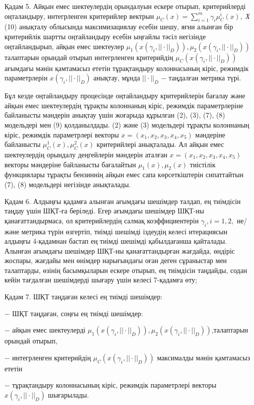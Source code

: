 \begin{multicols}{2}
Қадам 5. Айқын емес шектеулердің орындалуын ескере отырып, критерийлерді
оңталандыру, интегрленген критерийлер вектрын
$\mu_C(x)=\sum_{i=1}^m\gamma_i\mu_C^i(x),$ \emph{Х} (10) анықталу облысында
максимизациялау есебін шешу, яғни алынған бір критерийлік шартты
оңтайландыру есебін ыңғайлы тәсіл негізінде оңтайландырып, айқын емес
шектеулер $\mu_1(x(\gamma_i,||\cdot||_D)),\mu_2(x(\gamma_i,||\cdot||_D))$ талаптарын орындай отырып
интегрленген критерийдің $\mu_C(x(\gamma_i,||\cdot||_D))$ ағымдағы
мәнін қамтамасыз ететін тұрақтандыру колоннасының кіріс, режимдік
параметрлерін $x(\gamma_i,||\cdot||_D)$ анықтау, мұнда
$||\cdot||_D$ − таңдалған метрика түрі.

Бұл кезде оңтайландыру процесінде оңтайландыру критерийлерін бағалау
және айқын емес шектеулердің тұрақты колоннаның кіріс, режимдік
параметрлеріне байланысты мәндерін анықтау үшін жоғарыда құрылған (2),
(3), (7), (8) модельдері мен (9) қолданылдады. (2) және (3) модельдері
тұрақты колоннаның кіріс, режимдік параметрлері векторы
$x=(x_1,x_2,x_3,x_4,x_5)$ мәндеріне байланысты
$\mu_C^1(x),\mu_C^2(x)$ критерийлері анықталады. Ал айқын
емес шектеулердің орындалу деңгейлерін мәндерін аталған
$x=(x_1,x_2,x_3,x_4,x_5)$ векторы мәндеріне байланысты
бағалайтын $\mu_1(x),\mu_2(x)$ тиістілік функциялары
тұрақты бензиннің айқын емес сапа көрсеткіштерін сипаттайтын (7), (8)
модельдері негізінде анықталады.

Қадам 6. Алдыңғы қадамға алынған ағымдағы шешімдер талдап, ең тиімдісін
таңдау үшін ШҚТ-ға беріледі. Егер ағымдағы шешімдер ШҚТ-ны
қанағаттандырмаса, ол критерийлердің салмақ
коэффициентерін $\gamma_i,i=1,2,$ не/және метрика түрін
өзгертіп, тиімді шешімді іздеудің келесі итерациясын алдыңғы 4-қадамнан
бастап ең тиімді шешімді қабылдағанша қайталады. Алынған ағымдағы
шешімдер ШҚТ-ны қанағаттандырған жағдайда, өндіріс жоспары, жағдайы мен
өнімдер нарығындағы оған деген сұраныстар мен талаптарды, өзінің
басымқыларын ескере отырып, ең тиімдісін таңдайды, содан кейін тағдалған
шешімдерді шығару үшін келесі 7-қадамға өту;

Қадам 7. ШҚТ таңдаған келесі ең тиімді шешімдер:

− ШҚТ таңдаған, соңғы ең тиімді шешімдер:

− айқын емес шектеулерді
$\mu_1(x(\gamma_i,||\cdot||_D)),\mu_2(x(\gamma_i,||\cdot||_D))$,талаптарын
орындай отырып,

− интегрленген критерийдің $\mu_C(x(\gamma_i,||\cdot||_D))$
максималды мәнін қамтамасыз ететін

− тұрақтандыру колоннасының кіріс, режимдік параметрлері векторы
$x(\gamma_i,||\cdot||_D)$ шығарылады.


\end{multicols}
